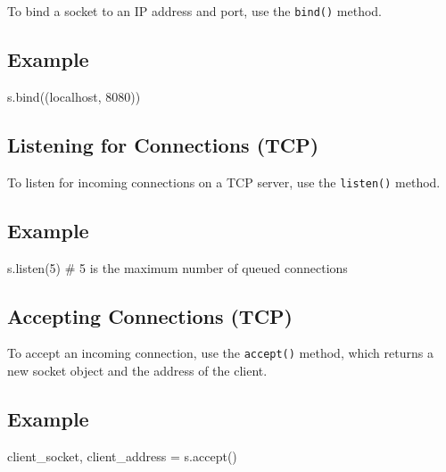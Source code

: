 \documentclass[
  letterpaper,
  DIV=11,
  numbers=noendperiod]{scrreprt}
\newenvironment{Shaded}{\begin{snugshade}}{\end{snugshade}}
\newcommand{\CommentTok}[1]{\textcolor[rgb]{0.37,0.37,0.37}{#1}}
\newcommand{\DecValTok}[1]{\textcolor[rgb]{0.68,0.00,0.00}{#1}}
\newcommand{\NormalTok}[1]{\textcolor[rgb]{0.00,0.23,0.31}{#1}}
\newcommand{\OperatorTok}[1]{\textcolor[rgb]{0.37,0.37,0.37}{#1}}
\newcommand{\StringTok}[1]{\textcolor[rgb]{0.13,0.47,0.30}{#1}}
\begin{document}
To bind a socket to an IP address and port, use the \texttt{bind()}
method.

\subsection{Example}\label{example-30}

\begin{Shaded}
\begin{Highlighting}[]
\NormalTok{s.bind((}\StringTok{\textquotesingle{}localhost\textquotesingle{}}\NormalTok{, }\DecValTok{8080}\NormalTok{))}
\end{Highlighting}
\end{Shaded}

\subsection{Listening for Connections
(TCP)}\label{listening-for-connections-tcp}

To listen for incoming connections on a TCP server, use the
\texttt{listen()} method.

\subsection{Example}\label{example-31}

\begin{Shaded}
\begin{Highlighting}[]
\NormalTok{s.listen(}\DecValTok{5}\NormalTok{)  }\CommentTok{\# 5 is the maximum number of queued connections}
\end{Highlighting}
\end{Shaded}

\subsection{Accepting Connections
(TCP)}\label{accepting-connections-tcp}

To accept an incoming connection, use the \texttt{accept()} method,
which returns a new socket object and the address of the client.

\subsection{Example}\label{example-32}

\begin{Shaded}
\begin{Highlighting}[]
\NormalTok{client\_socket, client\_address }\OperatorTok{=}\NormalTok{ s.accept()}
\end{Highlighting}
\end{Shaded}
\end{document}
